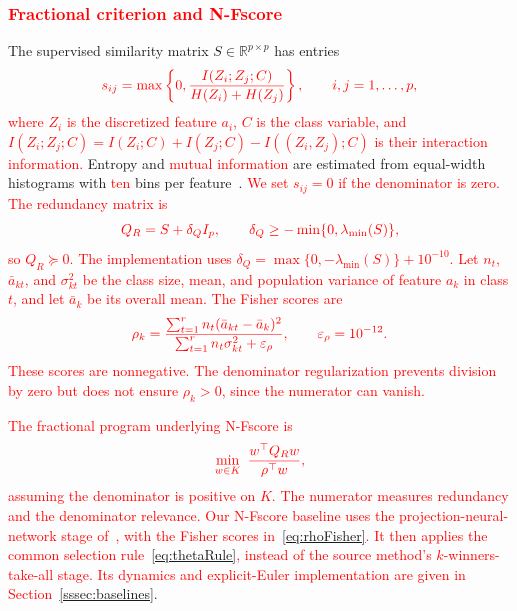 \documentclass[]{interact}
\theoremstyle{plain}
\theoremstyle{definition}
\theoremstyle{remark}
\newcommand{\R}{\mathbb{R}}
\begin{document}
\subsubsection{\textcolor{red}{Fractional criterion and N-Fscore}}\label{ssec:wang}\label{sssec:wang-inputs}\label{sssec:nfscore}
The supervised similarity matrix $S\in\R^{p\times p}$ has entries
\begin{equation}\label{eq:simMI}\textcolor{red}{
s_{ij}=\max\left\{0,\frac{I(Z_i;Z_j;C)}{H(Z_i)+H(Z_j)}\right\},\qquad i,j=1,\ldots,p,
}\end{equation}
\leavevmode\textcolor{red}{where $Z_i$ is the discretized feature $a_i$, $C$ is the class variable, and $I(Z_i;Z_j;C)=I(Z_i;C)+I(Z_j;C)-I((Z_i,Z_j);C)$ is their interaction information.} Entropy and \leavevmode\textcolor{red}{mutual information} are estimated from equal-width histograms with \leavevmode\textcolor{red}{ten} bins per feature~\citep{brown2012}. \leavevmode\textcolor{red}{We set $s_{ij}=0$ if the denominator is zero. The redundancy matrix is}
\begin{equation}\label{eq:matrixQ}\textcolor{red}{
Q_R=S+\delta_QI_p,\qquad \delta_Q\ge-\min\{0,\lambda_{\min}(S)\},
}\end{equation}
\leavevmode\textcolor{red}{so $Q_R\succeq0$. The implementation uses $\delta_Q=\max\{0,-\lambda_{\min}(S)\}+10^{-10}$. Let $n_t$, $\bar a_{kt}$, and $\sigma_{kt}^2$ be the class size, mean, and population variance of feature $a_k$ in class $t$, and let $\bar a_k$ be its overall mean. The Fisher scores are}
\begin{equation}\label{eq:rhoFisher}\textcolor{red}{
\rho_k=\frac{\sum_{t=1}^r n_t(\bar a_{kt}-\bar a_k)^2}{\sum_{t=1}^r n_t\sigma_{kt}^2+\varepsilon_\rho},\qquad \varepsilon_\rho=10^{-12}.
}\end{equation}
\leavevmode\textcolor{red}{These scores are nonnegative. The denominator regularization prevents division by zero but does not ensure $\rho_k>0$, since the numerator can vanish.}

\leavevmode\textcolor{red}{The fractional program underlying N-Fscore is}
\begin{equation}\label{eq:wangOrig}\textcolor{red}{
\min_{w\in K}\ \frac{w^{\top}Q_Rw}{\rho^{\top}w},
}\end{equation}
\leavevmode\textcolor{red}{assuming the denominator is positive on $K$. The numerator measures redundancy and the denominator relevance. Our N-Fscore baseline uses the projection-neural-network stage of~\citep{wang2021fractional}, with the Fisher scores in~\eqref{eq:rhoFisher}. It then applies the common selection rule~\eqref{eq:thetaRule}, instead of the source method's $k$-winners-take-all stage. Its dynamics and explicit-Euler implementation are given in Section~\ref{sssec:baselines}}.
\end{document}
